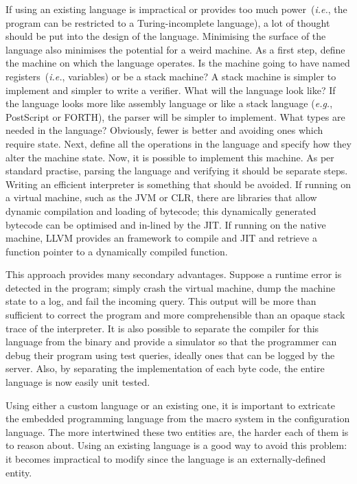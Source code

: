 \documentclass[letterpaper,twocolumn,10pt]{article}
\begin{document}
If using an existing language is impractical or provides too much power~(\emph{i.e.}, the program can be restricted to a Turing-incomplete language), a lot of thought should be put into the design of the language. Minimising the surface of the language also minimises the potential for a weird machine. As a first step, define the machine on which the language operates. Is the machine going to have named registers~(\emph{i.e.}, variables) or be a stack machine? A stack machine is simpler to implement and simpler to write a verifier. What will the language look like? If the language looks more like assembly language or like a stack language (\emph{e.g.}, PostScript or FORTH), the parser will be simpler to implement. What types are needed in the language? Obviously, fewer is better and avoiding ones which require state. Next, define all the operations in the language and specify how they alter the machine state. Now, it is possible to implement this machine. As per standard practise, parsing the language and verifying it should be separate steps. Writing an efficient interpreter is something that should be avoided. If running on a virtual machine, such as the JVM or CLR, there are libraries that allow dynamic compilation and loading of bytecode; this dynamically generated bytecode can be optimised and in-lined by the JIT. If running on the native machine, LLVM provides an framework to compile and JIT and retrieve a function pointer to a dynamically compiled function.

This approach provides many secondary advantages. Suppose a runtime error is detected in the program; simply crash the virtual machine, dump the machine state to a log, and fail the incoming query. This output will be more than sufficient to correct the program and more comprehensible than an opaque stack trace of the interpreter. It is also possible to separate the compiler for this language from the binary and provide a simulator so that the programmer can debug their program using test queries, ideally ones that can be logged by the server. Also, by separating the implementation of each byte code, the entire language is now easily unit tested.

Using either a custom language or an existing one, it is important to extricate the embedded programming language from the macro system in the configuration language. The more intertwined these two entities are, the harder each of them is to reason about. Using an existing language is a good way to avoid this problem: it becomes impractical to modify since the language is an externally-defined entity.
\end{document}
